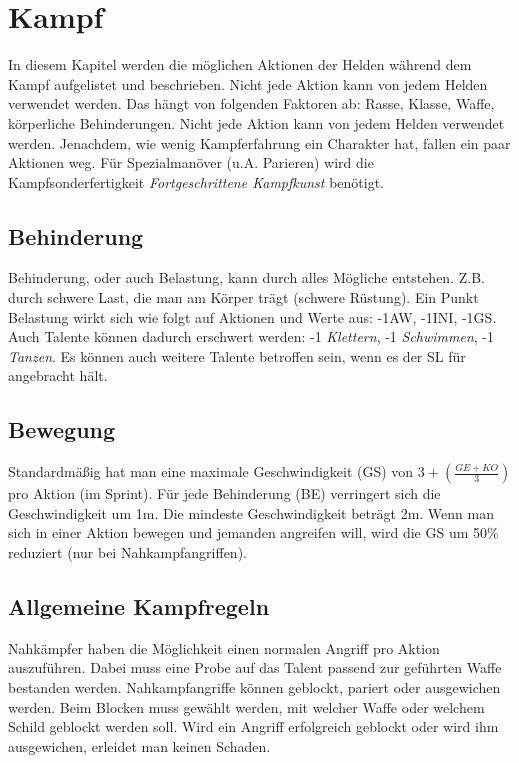 {\let\clearpage\relax\chapter{Kampf}}
In diesem Kapitel werden die möglichen Aktionen der Helden während dem Kampf aufgelistet und beschrieben. Nicht jede Aktion kann von jedem Helden verwendet werden. Das hängt von folgenden Faktoren ab: Rasse, Klasse, Waffe, körperliche Behinderungen. Nicht jede Aktion kann von jedem Helden verwendet werden. Jenachdem, wie wenig Kampferfahrung ein Charakter hat, fallen ein paar Aktionen weg. Für Spezialmanöver (u.A. Parieren) wird die Kampfsonderfertigkeit \textit{Fortgeschrittene Kampfkunst} benötigt.

\section{Behinderung}
Behinderung, oder auch Belastung, kann durch alles Mögliche entstehen. Z.B. durch schwere Last, die man am Körper trägt (schwere Rüstung). Ein Punkt Belastung wirkt sich wie folgt auf Aktionen und Werte aus: -1AW, -1INI, -1GS. Auch Talente können dadurch erschwert werden: -1 \textit{Klettern}, -1 \textit{Schwimmen}, -1 \textit{Tanzen}. Es können auch weitere Talente betroffen sein, wenn es der SL für angebracht hält.

\section{Bewegung}
Standardmäßig hat man eine maximale Geschwindigkeit (GS) von $3+(\frac{GE+KO}{3})$ pro Aktion (im Sprint). Für jede Behinderung (BE) verringert sich die Geschwindigkeit um 1m. Die mindeste Geschwindigkeit beträgt 2m. Wenn man sich in einer Aktion bewegen und jemanden angreifen will, wird die GS um 50\% reduziert (nur bei Nahkampfangriffen). 

\section{Allgemeine Kampfregeln}
Nahkämpfer haben die Möglichkeit einen normalen Angriff pro Aktion auszuführen. Dabei muss eine Probe auf das Talent passend zur geführten Waffe bestanden werden. Nahkampfangriffe können geblockt, pariert oder ausgewichen werden. Beim Blocken muss gewählt werden, mit welcher Waffe oder welchem Schild geblockt werden soll. Wird ein Angriff erfolgreich geblockt oder wird ihm ausgewichen, erleidet man keinen Schaden. 

